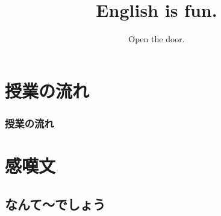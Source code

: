 \documentclass[aspectratio=169,xcolor={dvipsnames,table}]{beamer}
\title{English is fun.}
\subtitle{Open the door.
}
\author{}
\institute[]{}
\date[]
\begin{document}
\begin{frame}[plain]
  \titlepage
\end{frame}

\section*{授業の流れ}
\begin{frame}[plain]
  \frametitle{授業の流れ}
  \tableofcontents
\end{frame}

\section{感嘆文}
\subsection{なんて～でしょう}
\end{document}
